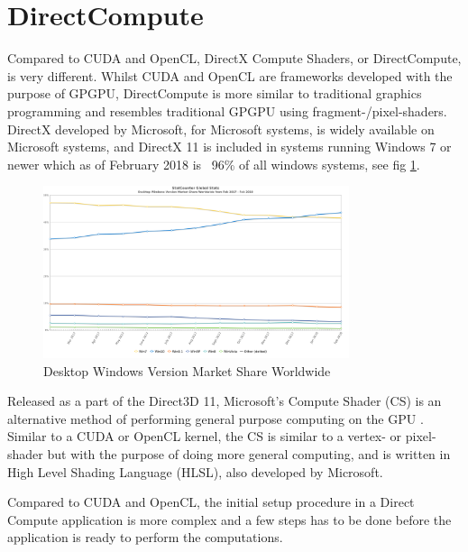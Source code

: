 \section{DirectCompute} \label{sec:DirectComputeImplementation}
Compared to CUDA and OpenCL, DirectX Compute Shaders, or DirectCompute, is very different. Whilst CUDA and OpenCL are frameworks developed with the purpose of GPGPU, DirectCompute is more similar to traditional graphics programming and resembles traditional GPGPU using fragment-/pixel-shaders. DirectX developed by Microsoft, for Microsoft systems, is widely available on Microsoft systems, and DirectX 11 is included in systems running Windows 7 or newer which as of February 2018 is ~96\% of all windows systems, see fig \ref{fig:WindowsStats}. \cite{WindowsStats}


\begin{figure}[!h]
    \centering
    \includegraphics[width=0.8\textwidth]{Method/Figs/StatCounter-windows_version-ww-monthly-201702-201802.png}
    \caption{Desktop Windows Version Market Share Worldwide}
    \label{fig:WindowsStats}
\end{figure}



Released as a part of the Direct3D 11, Microsoft's Compute Shader (CS) is an alternative method of performing general purpose computing on the GPU \cite{Direct3D11Features}. Similar to a CUDA or OpenCL kernel, the CS is similar to a vertex- or pixel-shader but with the purpose of doing more general computing, and is written in High Level Shading Language (HLSL), also developed by Microsoft. 


Compared to CUDA and OpenCL, the initial setup procedure in a Direct Compute application is more complex and a few steps has to be done before the application is ready to perform the computations. 


